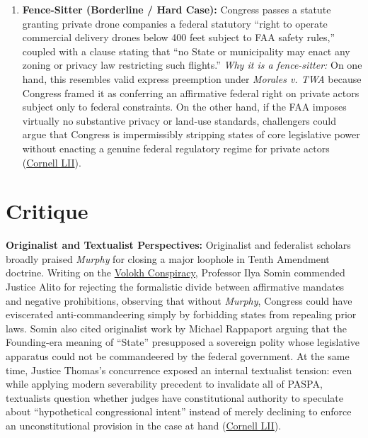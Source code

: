 \documentclass[12pt]{article}
\begin{document}
\begin{enumerate}
    \item \textbf{Fence-Sitter (Borderline / Hard Case):} Congress passes a statute granting private drone companies a federal statutory ``right to operate commercial delivery drones below 400 feet subject to FAA safety rules,'' coupled with a clause stating that ``no State or municipality may enact any zoning or privacy law restricting such flights.'' \textit{Why it is a fence-sitter:} On one hand, this resembles valid express preemption under \textit{Morales v. TWA} because Congress framed it as conferring an affirmative federal right on private actors subject only to federal constraints. On the other hand, if the FAA imposes virtually no substantive privacy or land-use standards, challengers could argue that Congress is impermissibly stripping states of core legislative power without enacting a genuine federal regulatory regime for private actors (\href{https://www.law.cornell.edu/supremecourt/text/16-476}{Cornell LII}).
\end{enumerate}

\section{Critique}

\textbf{Originalist and Textualist Perspectives:} Originalist and federalist scholars broadly praised \textit{Murphy} for closing a major loophole in Tenth Amendment doctrine. Writing on the \href{https://reason.com/volokh/2018/05/14/sports-gambling-decision-is-a-major-vict/}{Volokh Conspiracy}, Professor Ilya Somin commended Justice Alito for rejecting the formalistic divide between affirmative mandates and negative prohibitions, observing that without \textit{Murphy}, Congress could have eviscerated anti-commandeering simply by forbidding states from repealing prior laws. Somin also cited originalist work by Michael Rappaport arguing that the Founding-era meaning of ``State'' presupposed a sovereign polity whose legislative apparatus could not be commandeered by the federal government. At the same time, Justice Thomas's concurrence exposed an internal textualist tension: even while applying modern severability precedent to invalidate all of PASPA, textualists question whether judges have constitutional authority to speculate about ``hypothetical congressional intent'' instead of merely declining to enforce an unconstitutional provision in the case at hand (\href{https://www.law.cornell.edu/supremecourt/text/16-476}{Cornell LII}).
\end{document}
